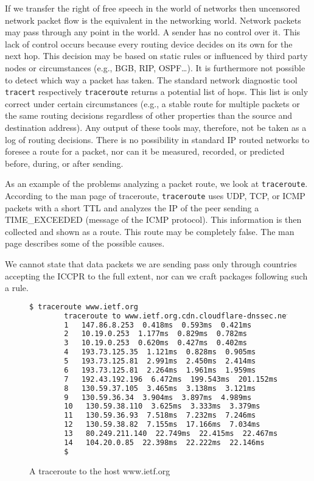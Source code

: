 If we transfer the right of free speech in the world of networks then uncensored network packet flow is the equivalent in the networking world. Network packets may pass through any point in the world. A sender has no control over it. This lack of control occurs because every routing device decides on its own for the next hop. This decision may be based on static rules or influenced by third party nodes or circumstances (e.g., BGB, RIP, OSPF\ldots). It is furthermore not possible to detect which way a packet has taken. The standard network diagnostic tool \verb|tracert| respectively \verb|traceroute| returns a potential list of hops. This list is only correct under certain circumstances (e.g., a stable route for multiple packets or the same routing decisions regardless of other properties than the source and destination address). Any output of these tools may, therefore, not be taken as a log of routing decisions. There is no possibility in standard IP routed networks to foresee a route for a packet, nor can it be measured, recorded, or predicted before, during, or after sending. 

As an example of the problems analyzing a packet route, we look at \verb|traceroute|. According to the man page of traceroute, \verb|traceroute| uses UDP, TCP, or ICMP packets with a short TTL and analyzes the IP of the peer sending a TIME\_EXCEEDED (message of the ICMP protocol). This information is then collected and shown as a route. This route may be completely false. The man page describes some of the possible causes.

We cannot state that data packets we are sending pass only through countries accepting the ICCPR to the full extent, nor can we craft packages following such a rule.

\begin{figure}[H]
	\begin{lstlisting}[language=bash,breaklines=true,basicstyle=\tiny]
		$ traceroute www.ietf.org
		traceroute to www.ietf.org.cdn.cloudflare-dnssec.net (104.20.0.85), 64 hops max
		1   147.86.8.253  0.418ms  0.593ms  0.421ms
		2   10.19.0.253  1.177ms  0.829ms  0.782ms
		3   10.19.0.253  0.620ms  0.427ms  0.402ms
		4   193.73.125.35  1.121ms  0.828ms  0.905ms
		5   193.73.125.81  2.991ms  2.450ms  2.414ms
		6   193.73.125.81  2.264ms  1.961ms  1.959ms
		7   192.43.192.196  6.472ms  199.543ms  201.152ms
		8   130.59.37.105  3.465ms  3.138ms  3.121ms
		9   130.59.36.34  3.904ms  3.897ms  4.989ms
		10   130.59.38.110  3.625ms  3.333ms  3.379ms
		11   130.59.36.93  7.518ms  7.232ms  7.246ms
		12   130.59.38.82  7.155ms  17.166ms  7.034ms
		13   80.249.211.140  22.749ms  22.415ms  22.467ms
		14   104.20.0.85  22.398ms  22.222ms  22.146ms
		$
	\end{lstlisting}
	\caption{A traceroute to the host www.ietf.org}
\end{figure}

